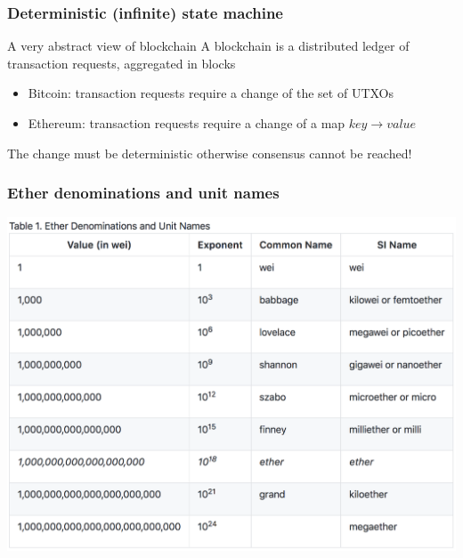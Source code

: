 \documentclass[11pt]{beamer}  %
\begin{document}
\begin{frame}\frametitle{Deterministic (infinite) state machine}

  \begin{greenbox}{A very abstract view of blockchain}
    A blockchain is a distributed ledger of transaction requests, aggregated in blocks
    \begin{itemize}
    \item[] \hspace*{-3ex}\alert{Bitcoin:} transaction requests require a change of the set of UTXOs
    \item[] \hspace*{-3ex}\alert{Ethereum:} transaction requests require a change of a
      map $\mathit{key}\to\mathit{value}$
    \end{itemize}
    The change must be \alert{deterministic} otherwise consensus cannot be reached!
  \end{greenbox}

\end{frame}

\begin{frame}\frametitle{Ether denominations and unit names}

  \begin{center}
    \includegraphics[scale=0.2,clip=false]{pictures/ether-denominations.png}
  \end{center}

\end{frame}
\end{document}
